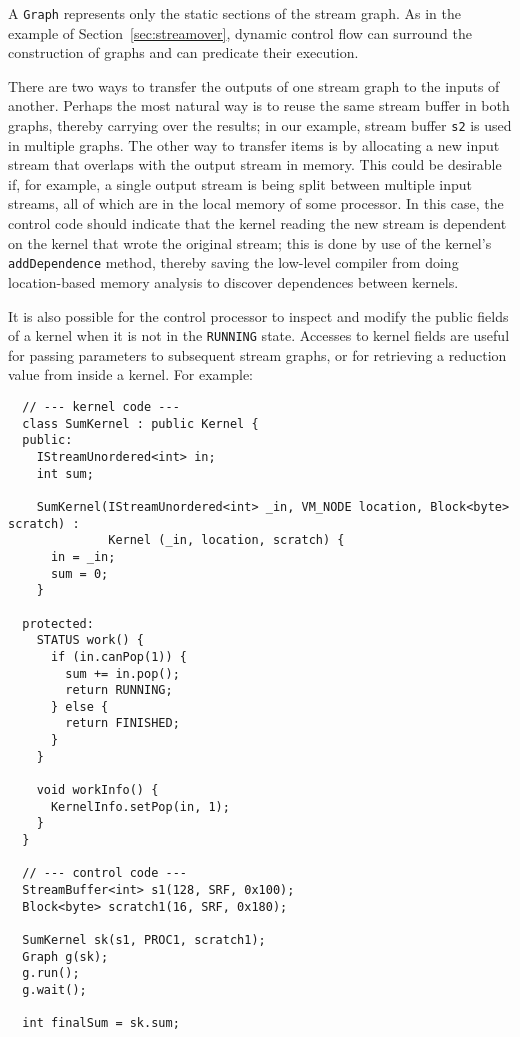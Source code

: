 
A {\tt Graph} represents only the static sections of the stream graph.
As in the example of Section~\ref{sec:streamover}, dynamic control
flow can surround the construction of graphs and can predicate their
execution.

There are two ways to transfer the outputs of one stream graph to the
inputs of another.  Perhaps the most natural way is to reuse the same
stream buffer in both graphs, thereby carrying over the results; in
our example, stream buffer {\tt s2} is used in multiple graphs.  The
other way to transfer items is by allocating a new input stream that
overlaps with the output stream in memory.  This could be desirable
if, for example, a single output stream is being split between
multiple input streams, all of which are in the local memory of some
processor.  In this case, the control code should indicate that the
kernel reading the new stream is dependent on the kernel that wrote
the original stream; this is done by use of the kernel's {\tt
addDependence} method, thereby saving the low-level compiler from
doing location-based memory analysis to discover dependences between
kernels.

It is also possible for the control processor to inspect and modify
the public fields of a kernel when it is not in the {\tt RUNNING}
state.  Accesses to kernel fields are useful for passing parameters to
subsequent stream graphs, or for retrieving a reduction value from
inside a kernel.  For example: 
{\small
\begin{verbatim}
  // --- kernel code ---
  class SumKernel : public Kernel {
  public:
    IStreamUnordered<int> in;
    int sum;

    SumKernel(IStreamUnordered<int> _in, VM_NODE location, Block<byte> scratch) : 
              Kernel (_in, location, scratch) {
      in = _in;
      sum = 0;
    }

  protected:
    STATUS work() {
      if (in.canPop(1)) {
        sum += in.pop();
        return RUNNING;
      } else {
        return FINISHED;
      }
    }

    void workInfo() {
      KernelInfo.setPop(in, 1);
    }
  }

  // --- control code ---
  StreamBuffer<int> s1(128, SRF, 0x100);
  Block<byte> scratch1(16, SRF, 0x180);

  SumKernel sk(s1, PROC1, scratch1);
  Graph g(sk);
  g.run();
  g.wait();

  int finalSum = sk.sum;
\end{verbatim}}

